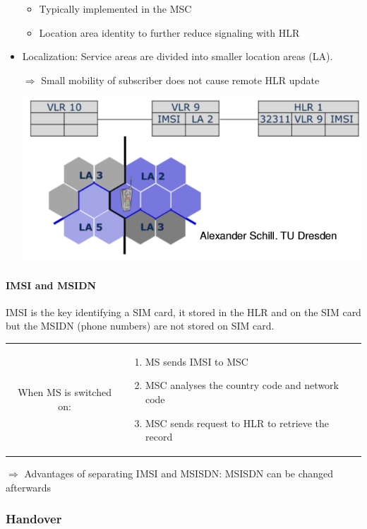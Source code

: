 \begin{itemize}
\begin{itemize}
            \item Typically implemented in the MSC
            \item Location area identity to further reduce signaling
                with HLR
        \end{itemize}

    \item Localization: Service areas are divided into smaller location
        areas (LA).

        $\Rightarrow$ Small mobility of subscriber does not cause remote HLR update

        \begin{center}
            \includegraphics[width=0.8\linewidth]{img/localization.png}
        \end{center}

\end{itemize}

\paragraph{IMSI and MSIDN}
IMSI is the key identifying a SIM card, it stored in the HLR and on the SIM card
but the MSIDN (phone numbers) are not stored on SIM card.

\begin{tabular}{cm{10cm}}
    When MS is switched on:&
    \begin{enumerate}
        \item MS sends IMSI to MSC
        \item MSC analyses the country code and network code
        \item MSC sends request to HLR to retrieve the record
    \end{enumerate}
\end{tabular}

$\Rightarrow$ Advantages of separating IMSI and MSISDN: MSISDN can be
changed afterwards

\subsubsection{Handover}

